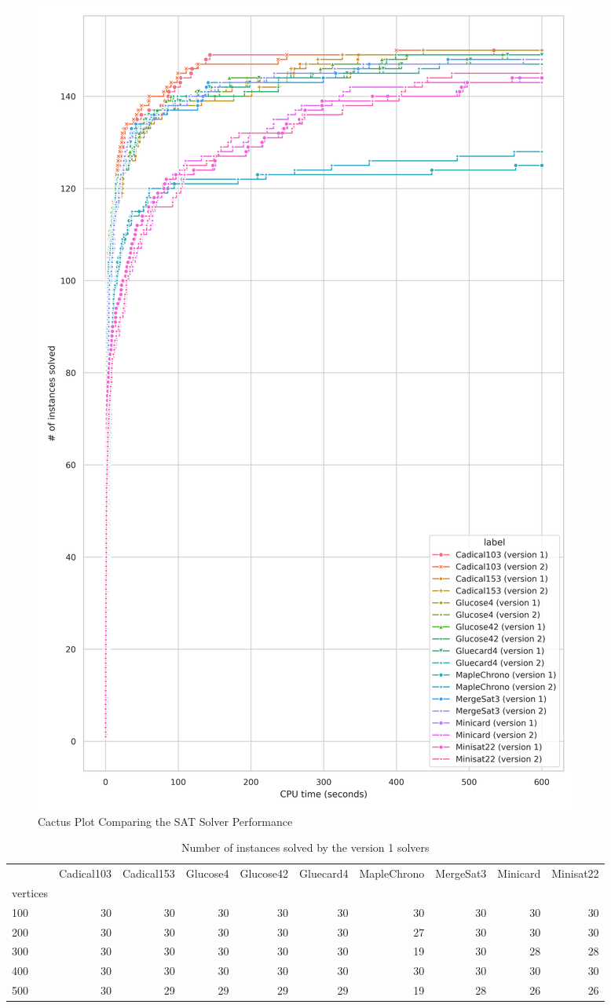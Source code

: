 \begin{figure}[htbp]
\centering
\includegraphics[scale=0.7]{Thesis/figures/minibenchmark_cactus_plot_runtime_SAT_with_holes.png}
\caption{Cactus Plot Comparing the SAT Solver Performance}
\label{fig:cactus_SAT}
\end{figure}

\begin{table}[htbp]
\centering
\footnotesize
\setlength{\tabcolsep}{2pt}
\begin{tabular}{lrrrrrrrrr}
\toprule
 & Cadical103 & Cadical153 & Glucose4 & Glucose42 & Gluecard4 & MapleChrono & MergeSat3 & Minicard & Minisat22 \\
vertices &  &  &  &  &  &  &  &  &  \\
\midrule
100 & 30 & 30 & 30 & 30 & 30 & 30 & 30 & 30 & 30 \\
200 & 30 & 30 & 30 & 30 & 30 & 27 & 30 & 30 & 30 \\
300 & 30 & 30 & 30 & 30 & 30 & 19 & 30 & 28 & 28 \\
400 & 30 & 30 & 30 & 30 & 30 & 30 & 30 & 30 & 30 \\
500 & 30 & 29 & 29 & 29 & 29 & 19 & 28 & 26 & 26 \\
\bottomrule
\end{tabular}
\caption{Number of instances solved by the version 1 solvers}
\label{tab:SAT_num_solved_v1}
\end{table}

